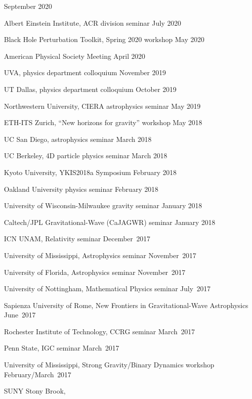 \begin{etaremune}
  \hfill{}
  September 2020
\item
  Albert Einstein Institute, ACR division seminar
  \hfill{}
  July 2020
\item
  Black Hole Perturbation Toolkit, Spring 2020 workshop
  \hfill{}
  May 2020
\item
  American Physical Society Meeting
  \hfill{}
  April 2020
\item
  UVA, physics department colloquium
  \hfill{}
  November 2019
\item
  UT Dallas, physics department colloquium
  \hfill{}
  October 2019
\item
  Northwestern University, CIERA astrophysics seminar
  \hfill{}
  May 2019
\item
  ETH-ITS Zurich, ``New horizons for gravity'' workshop
  \hfill{}
  May 2018
\item
  UC San Diego, astrophysics seminar
  \hfill{}
  March 2018
\item
  UC Berkeley, 4D particle physics seminar
  \hfill{}
  March 2018
\item
  Kyoto University, YKIS2018a Symposium
  \hfill{}
  February 2018
\item
  Oakland University physics seminar
  \hfill{}
  February 2018
\item
  University of Wisconsin-Milwaukee gravity seminar
  \hfill{}
  January 2018
\item
  Caltech/JPL Gravitational-Wave (CaJAGWR) seminar
  \hfill{}
  January 2018
\item
  ICN UNAM,
  Relativity seminar
  \hfill{}
  December~2017
\item
  University of Mississippi,
  Astrophysics seminar
  \hfill{}
  November~2017
\item
  University of Florida,
  Astrophysics seminar
  \hfill{}
  November~2017
\item
  University of Nottingham,
  Mathematical Physics seminar
  \hfill{}
  July~2017
\item
  Sapienza University of Rome,
  New Frontiers in Gravitational-Wave Astrophysics
  \hfill{}
  June~2017
\item
  Rochester Institute of Technology,
  CCRG seminar
  \hfill{}
  March~2017
\item
  Penn State,
  IGC seminar
  \hfill{}
  March~2017
\item
  University of Mississippi,
  Strong Gravity/Binary Dynamics workshop
  \hfill{}
  February/March~2017
\item
  SUNY Stony Brook,

\end{etaremune}
